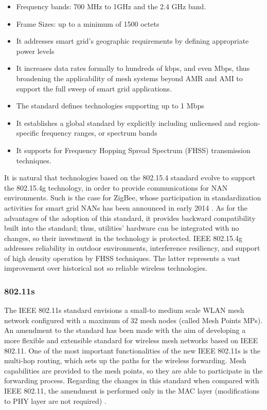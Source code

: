 \documentclass[11pt,draftclsnofoot,onecolumn]{IEEEtran}
\begin{document}
\begin{itemize}

	\item Frequency bands: 700 MHz to 1GHz and the 2.4 GHz band.
	\item Frame Sizes: up to a minimum of 1500 octets
	\item It addresses smart grid's geographic requirements by defining appropriate power levels
	\item It increases data rates formally to hundreds of kbps, and even Mbps, thus broadening the applicability of mesh systems beyond AMR and AMI to support the full sweep of smart grid applications. 
	\item The standard defines technologies supporting up to 1 Mbps
	\item It establishes a global standard by explicitly including unlicensed and region-specific frequency ranges, or spectrum bands
	\item It supports for Frequency Hopping Spread Spectrum (FHSS) transmission techniques.

\end{itemize}

It is natural that technologies based on the 802.15.4 standard evolve to support the 802.15.4g technology, in order to provide communications for NAN environments. Such is the case for ZigBee, whose participation in standardization activities for smart grid NANs has been announced in early 2014 \cite{Alliance2014}. As for the advantages of the adoption of this standard, it provides backward compatibility built into the standard; thus, utilities' hardware can be integrated with no changes, so their investment in the technology is protected. IEEE 802.15.4g addresses reliability in outdoor environments, interference resiliency, and support of high density operation by FHSS techniques. The latter represents a vast improvement over historical not so reliable wireless technologies.




\subsubsection{802.11s}\label{tech::80211s}

The IEEE 802.11s standard envisions a small-to medium scale WLAN mesh network configured with a maximum of 32 mesh nodes (called Mesh Points MPs). An amendment to the standard has been made with the aim of developing a more flexible and extensible standard for wireless mesh networks based on IEEE 802.11. One of the most important functionalities of the new IEEE 802.11s is the multi-hop routing, which sets up the paths for the wireless forwarding. Mesh capabilities are provided to the mesh points, so they are able to participate in the forwarding process. Regarding the changes in this standard when compared with IEEE 802.11, the amendment is performed only in the MAC layer (modifications to PHY layer are not required) \cite{Bahr2006}.
\end{document}
